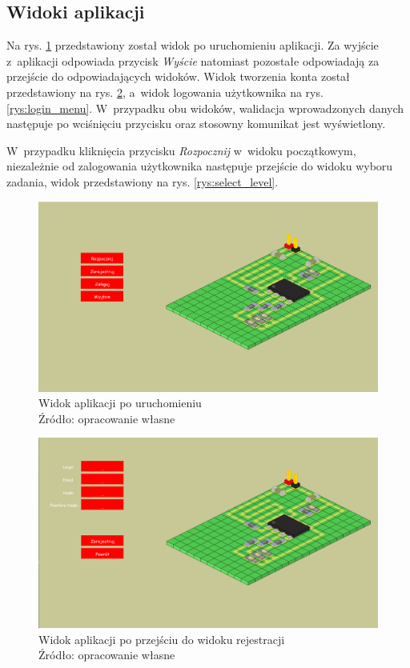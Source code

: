 \documentclass[12pt,a4paper]{article} %
\begin{document}
\subsection{Widoki aplikacji}

Na rys. \ref{rys:start_menu} przedstawiony został widok po uruchomieniu aplikacji. Za wyjście z~aplikacji odpowiada przycisk \textit{Wyście} natomiast pozostałe odpowiadają za przejście do odpowiadających widoków. Widok tworzenia konta został przedstawiony na rys. \ref{rys:register_menu}, a~widok logowania użytkownika na rys. \ref{rys:login_menu}. W~przypadku obu widoków, walidacja wprowadzonych danych następuje po wciśnięciu przycisku oraz stosowny komunikat jest wyświetlony.

W~przypadku kliknięcia przycisku \textit{Rozpocznij} w~widoku początkowym, niezależnie od zalogowania użytkownika następuje przejście do widoku wyboru zadania, widok przedstawiony na rys. \ref{rys:select_level}.

\begin{figure}[h]
	\centering
	\includegraphics[width=15cm]{images/start_menu.png}
	\caption{Widok aplikacji po uruchomieniu \\ Źródło: opracowanie własne}
	\label{rys:start_menu}
\end{figure} 

\begin{figure}[h]
	\centering
	\includegraphics[width=15cm]{images/register_menu.png}
	\caption{Widok aplikacji po przejściu do widoku rejestracji \\ Źródło: opracowanie własne}
	\label{rys:register_menu}
\end{figure} 
\end{document}
